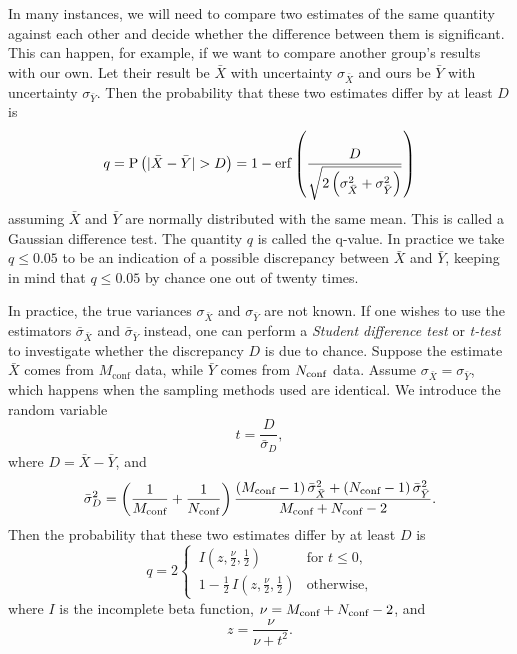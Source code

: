 In many instances, we will need to compare two estimates 
of the same quantity against each other and decide whether the difference 
between them is significant. This can happen, for example, if we want to
compare another group's results with our own. Let their result
be $\bar{X}$ with uncertainty $\sigma_{\bar{X}}$ and ours be
$\bar{Y}$ with uncertainty $\sigma_{\bar{Y}}$. Then the probability
that these two estimates differ by at least $D$ is
\begin{equation}\index{Gaussian difference test}
  q=\pr{|\bar{X}-\bar{Y}|>D}
    =1-\erf\left(\frac{D}{\sqrt{2
     \left(\sigma_{\bar{X}}^2+\sigma_{\bar{Y}}^2\right)}}\right)
\end{equation}
assuming $\bar{X}$ and $\bar{Y}$ are normally distributed with
the same mean. This is called a Gaussian difference test. 
The quantity $q$ is called the q-value.
In practice we take $q\leq0.05$ to be an indication of a possible 
discrepancy between $\bar{X}$ and $\bar{Y}$, keeping in mind that 
$q\leq0.05$ by chance one out of twenty times.

In practice, the true variances $\sigma_{\bar{X}}$ and $\sigma_{\bar{Y}}$
are not known. If one wishes to use the estimators $\bar{\sigma}_{\bar{X}}$
and $\bar{\sigma}_{\bar{Y}}$ instead, one can perform a {\it Student
difference test} or {\it t-test} to investigate whether the 
discrepancy $D$ is due to chance. Suppose the estimate $\bar{X}$ comes from 
$M_{\text{conf}}$ data, while $\bar{Y}$ comes from $N_{\text{conf}}$ data.
Assume $\sigma_{\bar{X}}=\sigma_{\bar{Y}}$, which
happens when the sampling methods used are identical.
We introduce the random variable
\begin{equation}
  t=\frac{D}{\bar{\sigma}_D},
\end{equation}
where $D=\bar{X}-\bar{Y}$, and
\begin{equation}
  \bar{\sigma}^2_D=\left(\frac{1}{M_{\text{conf}}}+\frac{1}{N_{\text{conf}}}\right)
                   \frac{(M_{\text{conf}}-1)\,\bar{\sigma}_{\bar{X}}^2
                    +(N_{\text{conf}}-1)\,\bar{\sigma}_{\bar{Y}}^2}
                   {M_{\text{conf}}+N_{\text{conf}}-2}.
\end{equation}
Then the probability that these two estimates differ by at least $D$ is
\begin{equation}
 q=2
 \begin{cases}
 \,I\left(z,\frac{\nu}{2},\frac{1}{2}\right) & \text{for }t\leq 0, \\
 \,1-\frac{1}{2}\,I\left(z,\frac{\nu}{2},\frac{1}{2}\right) & \text{otherwise},
 \end{cases}
\end{equation}
where $I$ is the incomplete beta function, $\nu=M_{\text{conf}}+N_{\text{conf}}-2$,
and
\begin{equation}
  z=\frac{\nu}{\nu+t^2}.
\end{equation}

